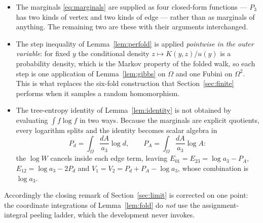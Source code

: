 \documentclass[11pt]{article}
\begin{document}
\begin{itemize}
\item The marginals \eqref{eq:marginals} are supplied as four closed-form
 functions --- $P_3$ has two kinds of vertex and two kinds of edge --- rather
 than as marginals of anything.  The remaining two are these with their
 arguments interchanged.
\item The step inequality of Lemma~\ref{lem:perfold} is applied
 \emph{pointwise in the outer variable}: for fixed $y$ the conditional density
 $z\mapsto K(y,z)/u(y)$ is a probability density, which is the Markov property
 of the folded walk, so each step is one application of Lemma~\ref{lem:gibbs}
 on $\Omega$ and one Fubini on $\Omega^2$.  This is what replaces the six-fold
 construction that Section~\ref{sec:finite} performs when it samples a random
 homomorphism.
\item The tree-entropy identity of Lemma~\ref{lem:identity} is not obtained by
 evaluating $\int f\log f$ in two ways.  Because the marginals are explicit
 quotients, every logarithm splits and the identity becomes scalar algebra in
 \[
  P_d=\int_\Omega\frac{dA}{a_3}\log d,\qquad
  P_A=\int_\Omega\frac{dA}{a_3}\log A :
 \]
 the $\log W$ cancels inside each edge term, leaving
 $E_{01}=E_{23}=\log a_3-P_A$, $E_{12}=\log a_3-2P_d$ and
 $V_1=V_2=P_d+P_A-\log a_3$, whose combination is $\log a_3$.
\end{itemize}

Accordingly the closing remark of Section~\ref{sec:limit} is corrected on one
point: the coordinate integrations of Lemma~\ref{lem:fold} do \emph{not} use
the assignment-integral peeling ladder, which the development never invokes.
\end{document}
